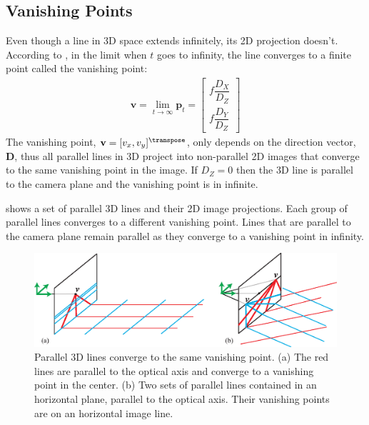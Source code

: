 


\subsection{Vanishing Points}

Even though a line in 3D space extends infinitely, its 2D projection doesn't. According to \eqn{\ref{eq:line_projection}}, in the limit when $t$ goes to infinity, the line converges to a finite point called the vanishing point:
\begin{eqnarray}
\mathbf{v} = \lim_{t \to \infty} \mathbf{p}_t =
\left [
\begin{array}{c}
    f \dfrac{D_X}{D_Z}\\[12pt]
    f \dfrac{D_Y}{D_Z}
    \end{array}
    \right ]
\label{eq:vanishingpoint}
\end{eqnarray}
The vanishing point, $\mathbf{v} = [v_x, v_y]^\transpose$, only depends on the direction vector, $\mathbf{D}$, thus all parallel lines in 3D project into non-parallel 2D images that converge to the same vanishing point in the image. If $D_Z = 0$ then the 3D line is parallel to the camera plane and the vanishing point is in infinite. 


\Fig{\ref{fig:vanishing_lines_and_planes}} shows a set of parallel 3D lines and their 2D image projections. Each group of parallel lines converges to a different vanishing point. Lines that are parallel to the camera plane remain parallel as they converge to a vanishing point in infinity. 

\begin{figure}[!h]
\centerline{
\includegraphics[width=1\linewidth]{figures/single_view_3d/vanishing_lines_and_planes.eps}
}
\caption{Parallel 3D lines converge to the same vanishing point. (a) The red lines are parallel to the optical axis and converge to a vanishing point in the center. (b) Two sets of parallel lines contained in an horizontal plane, parallel to the optical axis. Their vanishing points are on an horizontal image line.}
\label{fig:vanishing_lines_and_planes}
\end{figure}

